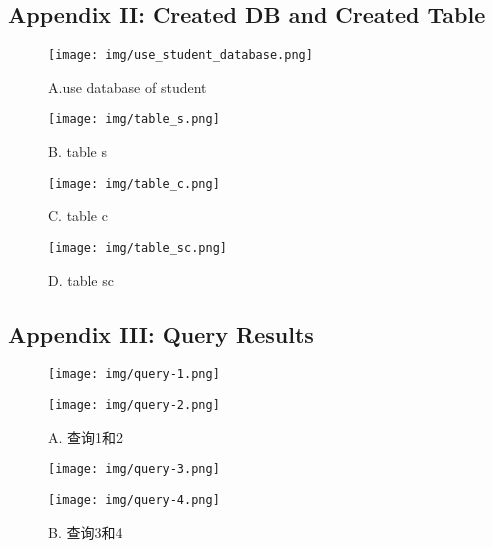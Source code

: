 \documentclass[UTF8]{ctexart}
\begin{document}
\subsection{Appendix II: Created DB and Created Table}

\begin{figure}[!htb]
  \centering
  \texttt{[image: img/use\_student\_database.png]}
  \caption{A.use database of student}\label{A. use_student_db}
\end{figure}


\begin{figure}[!htb]
  \centering
  \texttt{[image: img/table\_s.png]}
  \caption{B. table s}\label{B. table s}
\end{figure}


\begin{figure}[!htb]
  \centering
  \texttt{[image: img/table\_c.png]}
  \caption{C. table c}\label{C. table c}
\end{figure}

\begin{figure}[!htb]
  \centering
  \texttt{[image: img/table\_sc.png]}
  \caption{D. table sc}\label{D. table sc}
\end{figure}

\subsection{Appendix III: Query Results}
\begin{figure}[!htb]
      \centering
      \begin{minipage}[c]{0.5\textwidth}
      \centering
      \texttt{[image: img/query-1.png]}
      \end{minipage}%
      \begin{minipage}[c]{0.5\textwidth}
      \centering
      \texttt{[image: img/query-2.png]}
      \end{minipage}
      \caption{A. 查询1和2}
    \end{figure}

\begin{figure}[!htb]
      \centering
      \begin{minipage}[c]{0.5\textwidth}
      \centering
      \texttt{[image: img/query-3.png]}
      \end{minipage}%
      \begin{minipage}[c]{0.5\textwidth}
      \centering
      \texttt{[image: img/query-4.png]}
      \end{minipage}
      \caption{B. 查询3和4}
\end{figure}
\end{document}
